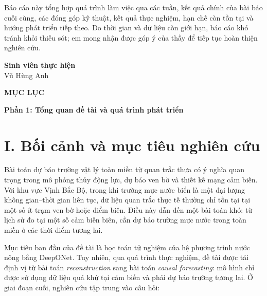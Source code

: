 \documentclass[a4paper, 12pt]{article}
\renewcommand{\contentsname}{\centering\huge\bfseries MỤC LỤC}
\begin{document}
\vspace{1em}
\noindent
Báo cáo này tổng hợp quá trình làm việc qua các tuần, kết quả chính của bài báo cuối cùng, các đóng góp kỹ thuật, kết quả thực nghiệm, hạn chế còn tồn tại và hướng phát triển tiếp theo. Do thời gian và dữ liệu còn giới hạn, báo cáo khó tránh khỏi thiếu sót; em mong nhận được góp ý của thầy để tiếp tục hoàn thiện nghiên cứu.

\vspace*{2em}
\begin{flushright}
    \textbf{Sinh viên thực hiện} \\[1em]
    Vũ Hùng Anh
\end{flushright}
\newpage

\vspace*{-1cm}
\begin{center}
    {\Large\textbf{MỤC LỤC}}
\end{center}
\vspace{0.5cm}
\renewcommand{\contentsname}{}
\tableofcontents
\newpage

\begin{center}
{\huge\bfseries Phần 1: Tổng quan đề tài và quá trình phát triển}
\end{center}

\section*{I. Bối cảnh và mục tiêu nghiên cứu}

Bài toán dự báo trường vật lý toàn miền từ quan trắc thưa có ý nghĩa quan trọng trong mô phỏng thủy động lực, dự báo ven bờ và thiết kế mạng cảm biến. Với khu vực Vịnh Bắc Bộ, trong khi trường mực nước biển là một đại lượng không gian--thời gian liên tục, dữ liệu quan trắc thực tế thường chỉ tồn tại tại một số ít trạm ven bờ hoặc điểm biên. Điều này dẫn đến một bài toán khó: từ lịch sử đo tại một số cảm biến biên, cần dự báo trường mực nước trong toàn miền ở các thời điểm tương lai.

Mục tiêu ban đầu của đề tài là học toán tử nghiệm của hệ phương trình nước nông bằng DeepONet. Tuy nhiên, qua quá trình thực nghiệm, đề tài được tái định vị từ bài toán \textit{reconstruction} sang bài toán \textit{causal forecasting}: mô hình chỉ được sử dụng dữ liệu quá khứ tại cảm biến và phải dự báo trường tương lai. Ở giai đoạn cuối, nghiên cứu tập trung vào câu hỏi:
\end{document}
